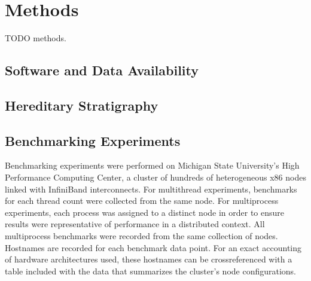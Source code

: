 \section{Methods} \label{moreno:sec:methods}

TODO methods.

\subsection{Software and Data Availability} \label{moreno:sec:software}





\subsection{Hereditary Stratigraphy}

\cite{singhvi2025scalable,moreno2024structured,moreno2025testing}

\subsection{Benchmarking Experiments} \label{moreno:sec:methods-code-data-reproducibility-benchmarking-experiments}

Benchmarking experiments were performed on Michigan State University's High Performance Computing Center, a cluster of hundreds of heterogeneous x86 nodes linked with InfiniBand interconnects.
For multithread experiments, benchmarks for each thread count were collected from the same node.
For multiprocess experiments, each process was assigned to a distinct node in order to ensure results were representative of performance in a distributed context.
All multiprocess benchmarks were recorded from the same collection of nodes.
Hostnames are recorded for each benchmark data point.
For an exact accounting of hardware architectures used, these hostnames can be crossreferenced with a table included with the data that summarizes the cluster's node configurations.

